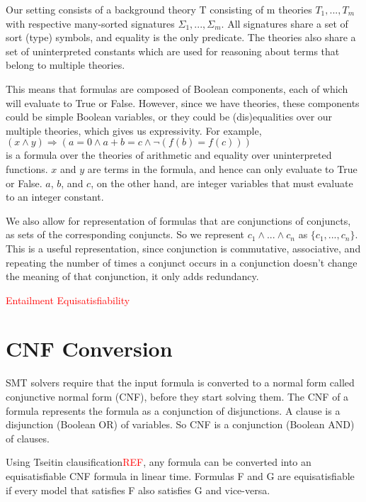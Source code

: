 \documentclass{article}
\begin{document}
Our setting consists of a background theory T consisting 
of m theories $T_1, ..., T_m$ with respective many-sorted 
signatures $\Sigma_1, ..., \Sigma_m$. All signatures share 
a set of sort (type) symbols, and equality is the only 
predicate. The theories also share a set of 
uninterpreted constants which are used for reasoning about 
terms that belong to multiple theories.

This means that formulas are composed of Boolean components, 
each of which will evaluate to True or False. However, since 
we have theories, these components could be simple Boolean 
variables, or they could be (dis)equalities over our 
multiple theories, which gives us expressivity. For example, \\
$(x \land y) \Rightarrow (a = 0 \land a + b = c \land 
\neg (f(b) = f(c)))$ \\
is a formula over the theories of arithmetic and equality 
over uninterpreted functions. $x$ and $y$ are terms in the 
formula, and hence can only evaluate to True or False.
$a$, $b$, and $c$, on the other hand, are integer variables 
that must evaluate to an integer constant.

We also allow for representation of formulas that are 
conjunctions of conjuncts, as sets of the corresponding 
conjuncts. So we represent $c_1 \land ... \land c_n$ as
$\{c_1, ..., c_n\}$. This is a useful representation, 
since conjunction is commutative, associative, and 
repeating the number of times a conjunct occurs in a 
conjunction doesn't change the meaning of that conjunction, 
it only adds redundancy.

\textcolor{red}{Entailment}
\textcolor{red}{Equisatisfiability}


\section{CNF Conversion}
SMT solvers require that the input formula is converted to a 
normal form called conjunctive normal form (CNF), before they 
start solving them. The CNF of a formula represents the 
formula as a conjunction of disjunctions. A clause is a 
disjunction (Boolean OR) of variables. So CNF is a 
conjunction (Boolean AND) of clauses. 

Using Tseitin clausification\textcolor{red}{REF}, any formula 
can be converted into an equisatisfiable CNF formula 
in linear time. Formulas F and G are equisatisfiable if 
every model that satisfies F also satisfies G and vice-versa.
\end{document}
